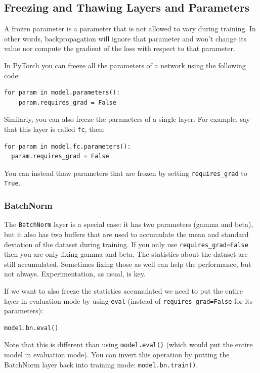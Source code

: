 \subsection{Freezing and Thawing Layers and Parameters}

A frozen parameter is a parameter that is not allowed to vary during training. In other words, backpropagation will ignore that parameter and won't change its value nor compute the gradient of the loss with respect to that parameter. \newline

In PyTorch you can freeze all the parameters of a network using the following code:
\begin{lstlisting}
for param in model.parameters():
    param.requires_grad = False
\end{lstlisting}
Similarly, you can also freeze the parameters of a single layer. For example, say that this layer is called \lstinline|fc|, then:
\begin{lstlisting}
for param in model.fc.parameters():
  param.requires_grad = False
\end{lstlisting}
You can instead thaw parameters that are frozen by setting \lstinline{requires_grad} to \lstinline|True|.

\subsubsection{BatchNorm}

The \lstinline|BatchNorm| layer is a special case: it has two parameters (gamma and beta), but it also has two buffers that are used to accumulate the mean and standard deviation of the dataset during training. If you only use \lstinline{requires_grad=False} then you are only fixing gamma and beta. The statistics about the dataset are still accumulated. Sometimes fixing those as well can help the performance, but not always. Experimentation, as usual, is key.\newline

If we want to also freeze the statistics accumulated we need to put the entire layer in evaluation mode by using \lstinline|eval| (instead of \lstinline{requires_grad=False} for its parameters):

\begin{lstlisting}
model.bn.eval()
\end{lstlisting}
Note that this is different than using \verb|model.eval()| (which would put the entire model in evaluation mode). You can invert this operation by putting the BatchNorm layer back into training mode: \verb|model.bn.train()|.

